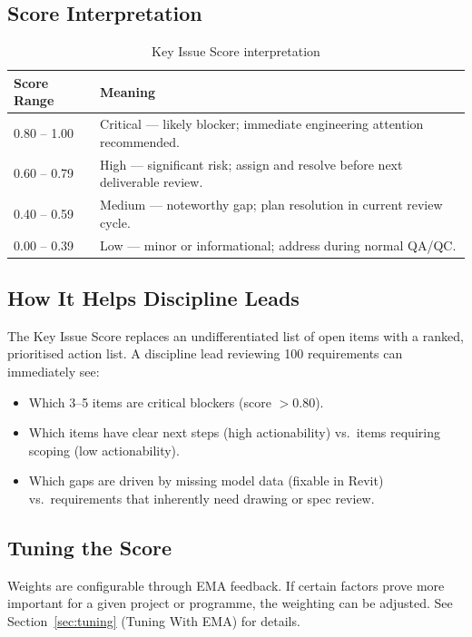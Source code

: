 \documentclass[10pt,letterpaper]{article}
\begin{document}
\subsection{Score Interpretation}

\begin{longtable}{p{0.9in}p{4.8in}}
\caption{Key Issue Score interpretation}
\label{tab:key-issue-interp}\\
\toprule
\textbf{Score Range} & \textbf{Meaning} \\
\midrule
\endhead
0.80 -- 1.00 & Critical --- likely blocker; immediate engineering attention recommended. \\
0.60 -- 0.79 & High --- significant risk; assign and resolve before next deliverable review. \\
0.40 -- 0.59 & Medium --- noteworthy gap; plan resolution in current review cycle. \\
0.00 -- 0.39 & Low --- minor or informational; address during normal QA/QC. \\
\bottomrule
\end{longtable}

\subsection{How It Helps Discipline Leads}

The Key Issue Score replaces an undifferentiated list of open items with a ranked, prioritised
action list. A discipline lead reviewing 100 requirements can immediately see:

\begin{itemize}
  \item Which 3--5 items are critical blockers (score $> 0.80$).
  \item Which items have clear next steps (high actionability) vs.\ items requiring scoping (low
        actionability).
  \item Which gaps are driven by missing model data (fixable in Revit) vs.\ requirements that
        inherently need drawing or spec review.
\end{itemize}

\subsection{Tuning the Score}

Weights are configurable through EMA feedback. If certain factors prove more important for a given
project or programme, the weighting can be adjusted. See Section~\ref{sec:tuning} (Tuning With EMA)
for details.
\end{document}
